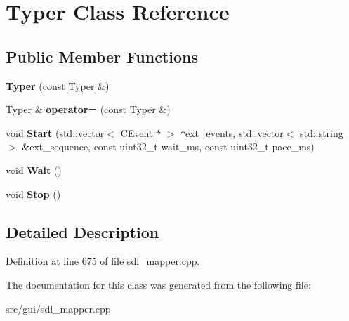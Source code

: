 \hypertarget{classTyper}{\section{Typer Class Reference}
\label{classTyper}
}
\subsection*{Public Member Functions}
\begin{DoxyCompactItemize}
\item 
\hypertarget{classTyper_a445c40f43a9db78ce0b2ca4f745fc3e3}{{\bfseries Typer} (const \hyperlink{classTyper}{Typer} \&)}\label{classTyper_a445c40f43a9db78ce0b2ca4f745fc3e3}

\item 
\hypertarget{classTyper_ad81eea11fd2f4ebf72af427fef068333}{\hyperlink{classTyper}{Typer} \& {\bfseries operator=} (const \hyperlink{classTyper}{Typer} \&)}\label{classTyper_ad81eea11fd2f4ebf72af427fef068333}

\item 
\hypertarget{classTyper_a744aa35192279125a42e942e2c3c121f}{void {\bfseries Start} (std\-::vector$<$ \hyperlink{classCEvent}{C\-Event} $\ast$ $>$ $\ast$ext\-\_\-events, std\-::vector$<$ std\-::string $>$ \&ext\-\_\-sequence, const uint32\-\_\-t wait\-\_\-ms, const uint32\-\_\-t pace\-\_\-ms)}\label{classTyper_a744aa35192279125a42e942e2c3c121f}

\item 
\hypertarget{classTyper_a1806f61a272752b6a73218b2d5177ecc}{void {\bfseries Wait} ()}\label{classTyper_a1806f61a272752b6a73218b2d5177ecc}

\item 
\hypertarget{classTyper_a87262deb9c2bb39b0ae61fb353772f6e}{void {\bfseries Stop} ()}\label{classTyper_a87262deb9c2bb39b0ae61fb353772f6e}

\end{DoxyCompactItemize}


\subsection{Detailed Description}


Definition at line 675 of file sdl\-\_\-mapper.\-cpp.



The documentation for this class was generated from the following file\-:\begin{DoxyCompactItemize}
\item 
src/gui/sdl\-\_\-mapper.\-cpp\end{DoxyCompactItemize}
